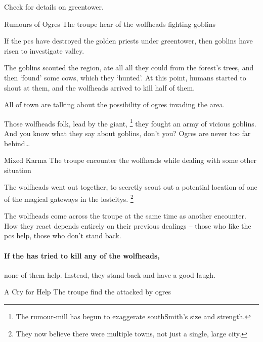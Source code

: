 Check  for details on \gls{greentower}.

{\squash Rumours of Ogres}%
{The troupe hear of the \glspl{wolfhead} fighting goblins}%

If the \glspl{pc} have destroyed the golden priests under \gls{greentower}, then goblins have risen to investigate \gls{valley}.

\begin{exampletext}
  The goblins scouted the region, ate all all they could from the forest's trees, and then `found' some cows, which they `hunted'.
  At this point, humans started to shout at them, and the \glspl{wolfhead} arrived to kill half of them.
\end{exampletext}

All of \gls{town} are talking about the possibility of ogres invading the area.

\begin{speechtext}
  Those \glspl{wolfhead} folk, lead by the giant,%
  \footnote{The rumour-mill has begun to exaggerate \gls{southSmith}'s size and strength.}
  they fought an army of vicious goblins.
  And you know what they say about goblins, don't you?
  Ogres are never too far behind\ldots
\end{speechtext}

{\squash Mixed Karma}%
{The troupe encounter the \glspl{wolfhead} while dealing with some other situation}%

\begin{exampletext}
  The \glspl{wolfhead} went out together, to secretly scout out a potential location of one of the magical gateways in the \glspl{lostcity}.%
  \footnote{They now believe there were multiple towns, not just a single, large city.}
\end{exampletext}

The \glspl{wolfhead} come across the troupe at the same time as another encounter.
How they react depends entirely on their previous dealings -- those who like the \glspl{pc} help, those who don't stand back.

\paragraph{If the  has tried to kill any of the \glspl{wolfhead},}
none of them help.
Instead, they stand back and have a good laugh.

{A Cry for Help}%
{The troupe find the  attacked by ogres}%

